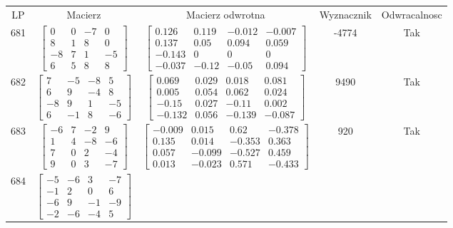 \documentclass[a4paper,12pt]{article}
\begin{document}
\bgroup {} \vspace{0.2in} \begin{tabular}{c c c c c}
LP & Macierz & Macierz odwrotna & Wyznacznik & Odwracalnosc\\
681
&
$\begin{bmatrix} 0 & 0 & -7 & 0 \\ 8 & 1 & 8 & 0 \\ -8 & 7 & 1 & -5 \\ 6 & 5 & 8 & 8 \end{bmatrix}$
&
$\begin{bmatrix} 0.126 & 0.119 & -0.012 & -0.007 \\ 0.137 & 0.05 & 0.094 & 0.059 \\ -0.143 & 0 & 0 & 0 \\ -0.037 & -0.12 & -0.05 & 0.094 \end{bmatrix}$
&
-4774
&
Tak
\\
682
&
$\begin{bmatrix} 7 & -5 & -8 & 5 \\ 6 & 9 & -4 & 8 \\ -8 & 9 & 1 & -5 \\ 6 & -1 & 8 & -6 \end{bmatrix}$
&
$\begin{bmatrix} 0.069 & 0.029 & 0.018 & 0.081 \\ 0.005 & 0.054 & 0.062 & 0.024 \\ -0.15 & 0.027 & -0.11 & 0.002 \\ -0.132 & 0.056 & -0.139 & -0.087 \end{bmatrix}$
&
9490
&
Tak
\\
683
&
$\begin{bmatrix} -6 & 7 & -2 & 9 \\ 1 & 4 & -8 & -6 \\ 7 & 0 & 2 & -4 \\ 9 & 0 & 3 & -7 \end{bmatrix}$
&
$\begin{bmatrix} -0.009 & 0.015 & 0.62 & -0.378 \\ 0.135 & 0.014 & -0.353 & 0.363 \\ 0.057 & -0.099 & -0.527 & 0.459 \\ 0.013 & -0.023 & 0.571 & -0.433 \end{bmatrix}$
&
920
&
Tak
\\
684
&
$\begin{bmatrix} -5 & -6 & 3 & -7 \\ -1 & 2 & 0 & 6 \\ -6 & 9 & -1 & -9 \\ -2 & -6 & -4 & 5 \end{bmatrix}$

\end{tabular}
\end{document}
